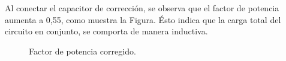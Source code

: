 Al conectar el capacitor de corrección, se observa que el factor 
de potencia aumenta a 0,55, como muestra la Figura. Ésto indica que 
la carga total del circuito en conjunto, se comporta de manera inductiva.

 \begin{figure}[H]
  \centering
  \caption{Factor de potencia corregido.}
  \label{fig:FDPCorregidoExp3}
\end{figure}
